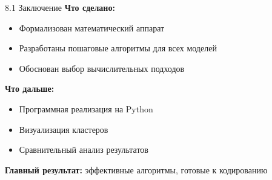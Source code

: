 \documentclass[
  ignorenonframetext,
  aspectratio=169,
  russian,
]{beamer}
\providecommand{\tightlist}{%
  \setlength{\itemsep}{0pt}\setlength{\parskip}{0pt}}
\begin{document}
\begin{frame}{8.1 Заключение}
\label{ux437ux430ux43aux43bux44eux447ux435ux43dux438ux435}
\textbf{Что сделано:}

\begin{itemize}
\tightlist
\item
  Формализован математический аппарат
\item
  Разработаны пошаговые алгоритмы для всех моделей
\item
  Обоснован выбор вычислительных подходов
\end{itemize}

\textbf{Что дальше:}

\begin{itemize}
\tightlist
\item
  Программная реализация на Python
\item
  Визуализация кластеров
\item
  Сравнительный анализ результатов
\end{itemize}

\textbf{Главный результат:} эффективные алгоритмы, готовые к кодированию
\end{frame}
\end{document}
